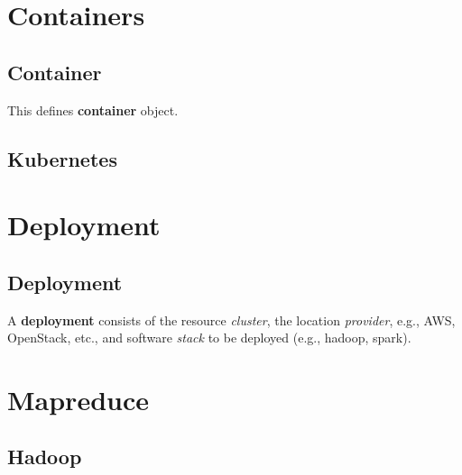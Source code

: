 \documentclass[9pt,twocolumn,twoside]{styles/osajnl}
\begin{document}


\section{Containers}

\subsection{Container}

This defines \textbf{container} object.


\subsection{Kubernetes}



\section{Deployment}

\subsection{Deployment}

A \textbf{deployment} consists of the resource \- \textit{cluster},
the location \- \textit{provider}, e.g., AWS, OpenStack, etc., and
software \textit{stack} to be deployed (e.g., hadoop, spark).


\section{Mapreduce}

\subsection{Hadoop}
\end{document}

